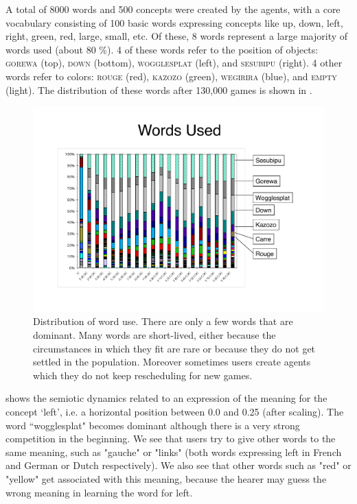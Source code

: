 A total of 8000 words and 500 concepts were created by the agents, with a core vocabulary consisting of 100 basic words expressing concepts like up, down, left, right, green, red, large, small, etc. Of these, 8 words represent a large majority of words used (about 80 \%). 4 of these words refer to the position of objects: \textsc{gorewa} (top), \textsc{down} (bottom), \textsc{wogglesplat} (left), and \textsc{sesubipu} (right). 4 other words refer to colors: \textsc{rouge} (red), \textsc{kazozo} (green), \textsc{wegirira} (blue), and \textsc{empty} (light). The distribution of these words after 130,000 games is shown in . 


\begin{figure}[htbp]
 \centerline{\includegraphics[width=\textwidth]{chap8/figures/words-used.pdf}}
\caption{\label{fig:words-used}Distribution of word use. There are only a few words that are dominant. Many words are 
short-lived, either because the circumstances 
in which they fit are rare or because they do not get settled in the population. Moreover sometimes users create agents 
which they do not keep rescheduling for new games. 
}
\end{figure}

 shows the semiotic dynamics related to an expression of the meaning for the 
concept `left', i.e. a horizontal position 
between 0.0 and 0.25 (after scaling). The word ``wogglesplat" becomes dominant
although there is a very strong competition in the beginning. 
We see that users try to give other words to the same meaning, such as "gauche" or "links" (both words expressing left 
in French and German or Dutch respectively). We also see that other words such as "red" or "yellow" get associated with this \enlargethispage{1\baselineskip}
meaning, because the hearer may guess the wrong meaning in learning the word for left. 

